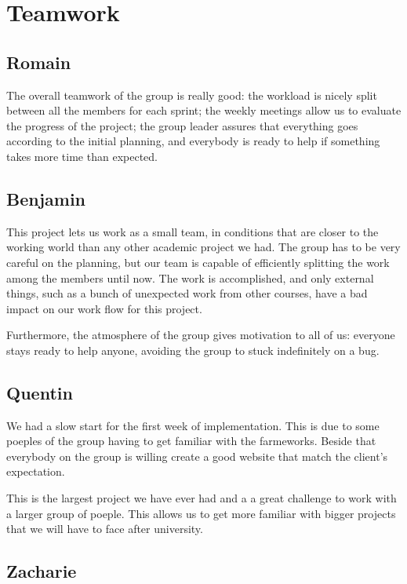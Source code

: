 \section{Teamwork}

\subsection{Romain}
The overall teamwork of the group is really good: the workload is nicely
split between all the members for each sprint; the weekly meetings allow
us to evaluate the progress of the project; the group leader assures that
everything goes according to the initial planning, and everybody is ready to
help if something takes more time than expected. \newline

\subsection{Benjamin}

This project lets us work as a small team, in conditions that are closer to the working world than any other academic project we had. The group has to be very careful on the planning, but our team is capable of efficiently splitting the work among the members until now. The work is accomplished, and only external things, such as a bunch of unexpected work from other courses, have a bad impact on our work flow for this project. \newline

Furthermore, the atmosphere of the group gives motivation to all of us: everyone stays ready to help anyone, avoiding the group to stuck indefinitely on a bug.

\subsection{Quentin}
We had a slow start for the first week of implementation. This is due to some poeples of the group having to get familiar with the farmeworks. Beside that everybody on the group is willing create a good website that match the client's expectation.

This is the largest project we have ever had and a a great challenge to work with a larger group of poeple. This allows us to get more familiar with bigger projects that we will have to face after university. 


\subsection{Zacharie}
